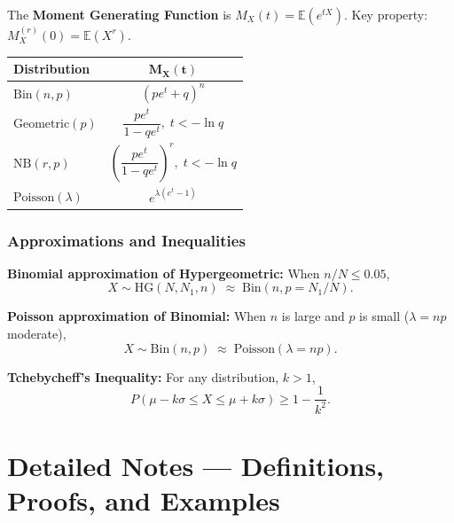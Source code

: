 \documentclass{article}
\theoremstyle{remark}
\newlength{\subsecindent}
\newenvironment{secbody}{%
  \begin{list}{}{%
    \setlength{\leftmargin}{\subsecindent}%
    \setlength{\rightmargin}{0pt}%
    \setlength{\topsep}{0pt}%
    \setlength{\partopsep}{0pt}%
    \setlength{\parsep}{\parskip}%
    \setlength{\itemsep}{\parskip}%
  }\item\relax
}{\end{list}}
\newcommand{\E}{\mathbb{E}}
\begin{document}
\begin{secbody}

The \textbf{Moment Generating Function} is $M_X(t) = \E(e^{tX})$.
Key property: $M_X^{(r)}(0) = \E(X^r)$.

\begin{center}
\renewcommand{\arraystretch}{1.6}
\begin{tabular}{@{}lc@{}}
\toprule
\textbf{Distribution} & $\boldsymbol{M_X(t)}$ \\
\midrule
$\text{Bin}(n, p)$       & $(pe^t + q)^n$ \\
$\text{Geometric}(p)$    & $\dfrac{pe^t}{1 - qe^t}, \; t < -\ln q$ \\
$\text{NB}(r, p)$        & $\left(\dfrac{pe^t}{1 - qe^t}\right)^r, \; t < -\ln q$ \\
$\text{Poisson}(\lambda)$ & $e^{\lambda(e^t - 1)}$ \\
\bottomrule
\end{tabular}
\end{center}

\end{secbody}

\section{Approximations and Inequalities}
\label{sec:ov-approx}

\begin{secbody}

\textbf{Binomial approximation of Hypergeometric:}
When $n/N \le 0.05$,
\[
  X \sim \text{HG}(N, N_1, n) \;\approx\; \text{Bin}(n, p = N_1/N).
\]

\textbf{Poisson approximation of Binomial:}
When $n$ is large and $p$ is small ($\lambda = np$ moderate),
\[
  X \sim \text{Bin}(n, p) \;\approx\; \text{Poisson}(\lambda = np).
\]

\textbf{Tchebycheff's Inequality:} For any distribution, $k > 1$,
\[
  \boxed{P(\mu - k\sigma \le X \le \mu + k\sigma) \ge 1 - \frac{1}{k^2}.}
\]

\end{secbody}


\newpage
\part{Detailed Notes --- Definitions, Proofs, and Examples}
\label{part:detailed}
\end{document}
